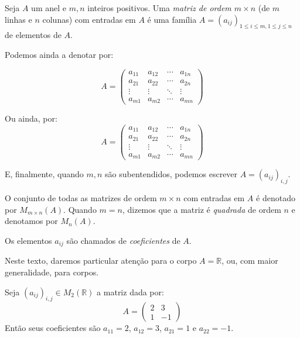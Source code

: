 \begin{definition}
    Seja $A$ um anel e $m, n$ inteiros positivos.
    Uma \emph{matriz de ordem $m \times n$} (de $m$ linhas e $n$ colunas) com entradas em $A$ é uma família $A=(a_{ij})_{1 \leq i \leq m, 1 \leq j \leq n}$ de elementos de $A$.

    Podemos ainda a denotar por:

    \begin{equation*}
        A = \begin{pmatrix}
            a_{11} & a_{12} & \cdots & a_{1n} \\
            a_{21} & a_{22} & \cdots & a_{2n} \\
            \vdots & \vdots & \ddots & \vdots \\
            a_{m1} & a_{m2} & \cdots & a_{mn}
        \end{pmatrix}
    \end{equation*}

    Ou ainda, por:
    \begin{equation*}
        A = \begin{pmatrix}
            a_{11} & a_{12} & \cdots & a_{1n} \\
            a_{21} & a_{22} & \cdots & a_{2n} \\
            \vdots & \vdots & \ddots & \vdots \\
            a_{m1} & a_{m2} & \cdots & a_{mn}
        \end{pmatrix}
    \end{equation*}

    E, finalmente, quando $m, n$ são subentendidos, podemos escrever $A=(a_{ij})_{i, j}$.

    O conjunto de todas as matrizes de ordem $m \times n$ com entradas em $A$ é denotado por $M_{m \times n}(A)$.
    Quando $m=n$, dizemos que a matriz é \emph{quadrada} de ordem $n$ e denotamos por $M_n(A)$.

    Os elementos $a_{ij}$ são chamados de \emph{coeficientes} de $A$.
\end{definition}

Neste texto, daremos particular atenção para o corpo $A=\mathbb R$, ou, com maior generalidade, para corpos.

\begin{example}
    Seja $(a_{ij})_{i, j}\in M_{2}(\mathbb R)$ a matriz dada por:
    \begin{equation*}
        A = \begin{pmatrix}
            2 & 3 \\
            1 & -1
        \end{pmatrix}
    \end{equation*}
    Então seus coeficientes são $a_{11}=2$, $a_{12}=3$, $a_{21}=1$ e $a_{22}=-1$.
\end{example}

